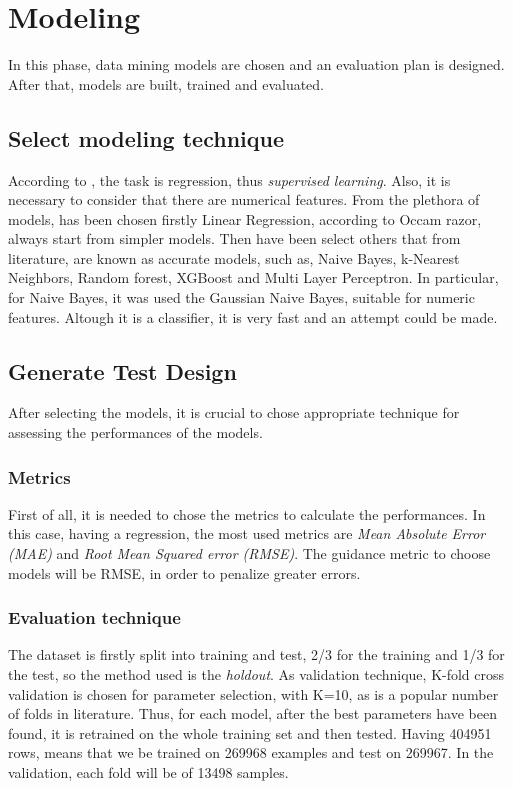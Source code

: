 \section{Modeling}

In this phase, data mining models are chosen and an evaluation plan is designed. After that, models are built, trained and evaluated.
\subsection{Select modeling technique}

According to , the task is regression, thus \textit{supervised learning}. Also, it is necessary to consider that there are numerical features. From the plethora of models, has been chosen firstly Linear Regression, according to Occam razor, always start from simpler models. Then have been select others that from literature, are known as accurate models, such as, Naive Bayes, k-Nearest Neighbors, Random forest, XGBoost and Multi Layer Perceptron. 
In particular, for Naive Bayes, it was used the Gaussian Naive Bayes, suitable for numeric features. Altough it is a classifier, it is very fast and an attempt could be made.


\subsection{Generate Test Design}

After selecting the models, it is crucial to chose appropriate technique for assessing the performances of the models.

\subsubsection{Metrics}

First of all, it is needed to chose the metrics to calculate the performances. In this case, having a regression, the most used metrics are \textit{Mean Absolute Error (MAE)} and \textit{Root Mean Squared error (RMSE)}. The guidance metric to choose models will be RMSE, in order to penalize greater errors.

\subsubsection{Evaluation technique}

The dataset is firstly split into training and test, 2/3 for the training and 1/3 for the test, so the method used is the \textit{holdout}. 
As validation technique, K-fold cross validation is chosen for parameter selection, with K=10, as is a popular number of folds in literature.
Thus, for each model, after the best parameters have been found, it is retrained on the whole training set and then tested.
Having 404951 rows, means that we be trained on 269968 examples and test on 269967. In the validation, each fold will be of 13498 samples.

